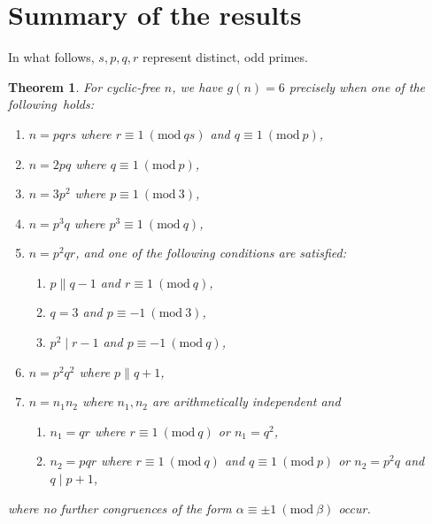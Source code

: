 \documentclass[a4paper, 12pt]{article}
\newcommand{\Mod}[1]{\ (\mathrm{mod} \ #1)}
\theoremstyle{plain}
\newtheorem{thm}{Theorem}[section]
\theoremstyle{definition}
\begin{document}
\section{Summary of the results}
In what follows, $s, p, q, r$ represent distinct, odd primes.
\nopagebreak
{}
\begin{thm}
	For cyclic-free $n$, we have $g(n) = 6$ precisely when one of the \mbox{following holds:}
	\begin{enumerate} \listspace
		\item$n = pqrs$ where $r \equiv 1 \Mod{qs}$ and $q \equiv 1 \Mod{p}$,\nopagebreak[4] 
		\item\nopagebreak[4] $n = 2pq$ where $q \equiv 1 \Mod{p}$,
		\item $n = 3p^2$ where $p \equiv 1 \Mod{3}$,
		\item $n = p^3 q$ where $p^3 \equiv 1 \Mod{q}$,
		\item $n = p^2 q r$, and one of the following conditions are satisfied:
		\begin{enumerate}
			\item $p \parallel q - 1$ and $r \equiv 1 \Mod{q}$,
			\item $q = 3$ and $p \equiv -1 \Mod{3}$, \nopagebreak[4]
			\item\nopagebreak[4] $p^2 \mid r - 1$ and $p \equiv -1 \Mod{q}$,
		\end{enumerate}
		\item $n = p^2 q^2$ where $p \parallel q + 1$,
		\item $n = n_1 n_2$ where $n_1, n_2$ are arithmetically independent and
		\begin{enumerate}
			\item $n_1 = qr$ where $r \equiv 1 \Mod{q}$ or $n_1 = q^2$,
			\item $n_2 = pqr$ where $r \equiv 1 \Mod{q}$ and $q \equiv 1 \Mod{p}$ or $n_2 = p^2 q$ and $q \mid p + 1$,
		\end{enumerate}
	\end{enumerate} \textspace
	\nopagebreak[4] where no further congruences of the form $\alpha \equiv \pm 1 \Mod{\beta}$ \nolinebreak[4] \mbox{occur}.
\end{thm}
\end{document}
